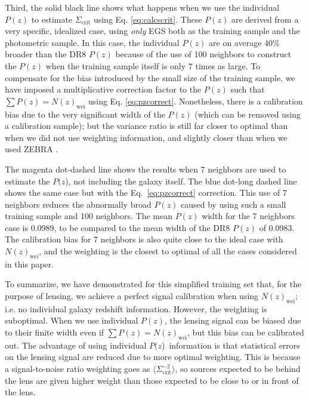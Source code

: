 \documentclass[preprint]{aastex}
\newcommand{\pofz}{$P(z$)}
\begin{document}
Third, the solid black line shows what happens when we use the individual
$P(z)$ to estimate $\Sigma_\mathrm{crit}$ using Eq. \ref{eq:calcscrit}.  These
$P(z)$ are derived from a very specific, idealized case, using {\em only} EGS
both as the training sample and the photometric sample.  In this case, the
individual $P(z)$ are on average $40\%$ broader than the DR8 $P(z)$ because of
the use of 100 neighbors to construct the $P(z)$ when the training sample
itself is only $7$ times as large.  To compensate for the bias introduced by
the small size of the training sample, we have imposed a multiplicative
correction factor to the $P(z)$ such that $\sum P(z) = N(z)_\mathrm{wei}$ using
Eq. \ref{eq:pzcorrect}.  Nonetheless, there is a calibration bias due to the
very significant width of the $P(z)$ (which can be removed using a calibration
sample); but the variance ratio is still far closer to optimal than when we did
not use weighting information, and slightly closer than when we used ZEBRA
\photoz.  

The magenta dot-dashed line shows the results when 7 neighbors are used to
estimate the \pofz, not including the galaxy itself. The blue dot-long dashed
line shows the same case but with the Eq.~\ref{eq:pzcorrect} correction.  This
use of 7 neighbors reduces the abnormally broad $P(z)$ caused by using such a
small training sample and 100 neighbors.  The mean $P(z)$ width for the 7
neighbors case is 0.0989, to be compared to the mean width of the DR8 $P(z)$ of
0.0983. The calibration bias for 7 neighbors is also quite close to the ideal
case with $N(z)_\mathrm{wei}$, and the weighting is the closest to optimal of
all the cases considered in this paper.

To summarize, we have demonstrated for this simplified training set that, for
the purpose of lensing, we achieve a perfect signal calibration when using
$N(z)_\mathrm{wei}$; i.e. no individual galaxy redshift information.  However,
the weighting is suboptimal.  When we use individual $P(z)$, the lensing signal
can be biased due to their finite width even if $\sum P(z) =
N(z)_\mathrm{wei}$, but this bias can be calibrated out.  The advantage of
using individual \pofz\ information is that statistical errors on the lensing
signal are reduced due to more optimal weighting.  This is because a
signal-to-noise ratio weighting goes as $\langle \Sigma_{\mathrm{crit}}^{-2}
\rangle$, so sources expected to be behind the lens are given higher weight
than those expected to be close to or in front of the lens.
\end{document}
